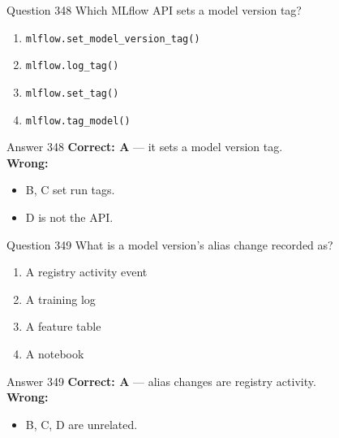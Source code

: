 \documentclass[aspectratio=169,11pt]{beamer}
\begin{document}
	\begin{frame}{Question 348}
		Which MLflow API sets a model version tag?
		\begin{enumerate}[label=\Alph*.]
			\item \texttt{mlflow.set\_model\_version\_tag()}
			\item \texttt{mlflow.log\_tag()}
			\item \texttt{mlflow.set\_tag()}
			\item \texttt{mlflow.tag\_model()}
		\end{enumerate}
	\end{frame}
	\begin{frame}{Answer 348}
		\textbf{Correct: A} --- it sets a model version tag.\\
		\vspace{0.5em}
		\textbf{Wrong:}
		\begin{itemize}
			\item B, C set run tags.
			\item D is not the API.
		\end{itemize}
	\end{frame}
	
	\begin{frame}{Question 349}
		What is a model version's alias change recorded as?
		\begin{enumerate}[label=\Alph*.]
			\item A registry activity event
			\item A training log
			\item A feature table
			\item A notebook
		\end{enumerate}
	\end{frame}
	\begin{frame}{Answer 349}
		\textbf{Correct: A} --- alias changes are registry activity.\\
		\vspace{0.5em}
		\textbf{Wrong:}
		\begin{itemize}
			\item B, C, D are unrelated.
		\end{itemize}
	\end{frame}
	
\end{document}

